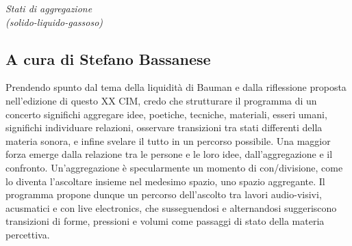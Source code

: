 \documentclass[9pt, twoside, a5paper]{extreport}
\begin{document}
{\fontsize{30}{30}\selectfont \textit{Stati di aggregazione \\ (solido-liquido-gassoso)}}

\subsection*{\textsf{A cura di Stefano Bassanese}}
{\fontsize{8}{8}\selectfont Prendendo spunto dal tema della liquidità di Bauman e dalla riflessione proposta nell'edizione di questo XX CIM, credo che strutturare il programma di un concerto significhi aggregare idee, poetiche, tecniche, materiali, esseri umani, significhi individuare relazioni, osservare transizioni tra stati differenti della materia sonora, e infine svelare il tutto in un percorso possibile.
Una maggior forza emerge dalla relazione tra le persone e le loro idee, dall'aggregazione e il confronto. Un'aggregazione è specularmente un momento di con/divisione, come lo diventa l'ascoltare insieme nel medesimo spazio, uno spazio aggregante.
Il programma propone dunque un percorso dell'ascolto tra lavori audio-visivi, acusmatici e con live electronics, che susseguendosi e alternandosi suggeriscono transizioni di forme, pressioni e volumi come passaggi di stato della materia percettiva.}

\bigskip
\end{document}
